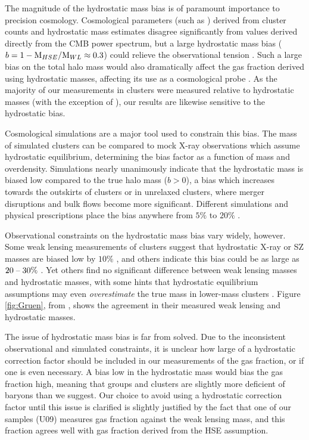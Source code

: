 The magnitude of the hydrostatic mass bias is of paramount importance
to precision cosmology. Cosmological parameters (such as \omegam{})
derived from \Planck{} cluster counts and hydrostatic mass estimates
disagree significantly from values derived directly from the CMB power
spectrum, but a large hydrostatic mass bias ($ b= 1-
\textrm{M}{}_{HSE}/\textrm{M}{}_{WL} \approx 0.3$) could relieve the
observational tension \citep{Gruen2013,VonderLinden2014,
  Israel2014}. Such a large bias on the total halo mass would also
dramatically affect the gas fraction derived using hydrostatic masses,
affecting its use as a cosmological probe
. As the majority of our \fg{}
measurements in clusters were measured relative to hydrostatic masses
(with the exception of \citet{Umetsu2009}), our results are likewise
sensitive to the hydrostatic bias.

Cosmological simulations are a major tool used to constrain this bias.
The mass of simulated clusters can be compared to mock X-ray
observations which assume hydrostatic equilibrium, determining the
bias factor as a function of mass and overdensity. Simulations nearly
unanimously indicate that the hydrostatic mass is biased low compared
to the true halo mass ($b>0$), a bias which increases towards the
outskirts of clusters or in unrelaxed clusters, where merger
disruptions and bulk flows become more significant. Different
simulations and physical prescriptions place the bias anywhere from
$5\%$  to $20\%$
.

Observational constraints on the hydrostatic mass bias vary widely,
however. Some weak lensing measurements of clusters suggest that
hydrostatic X-ray or SZ masses are biased low by $10\%$
\citep{Andersson2011,High2012}, and others indicate this bias could be
as large as $20\;\textrm{--}\;30\%$
\citep{Arnaud2007,Ichikawa2013,VonderLinden2014}. Yet others find no
significant difference between weak lensing masses and hydrostatic
masses, with some hints that hydrostatic equilibrium assumptions may
even \textit{overestimate} the true mass in lower-mass clusters
\citep{Gruen2013, Israel2014}. Figure \ref{fig:Gruen}, from
\citet{Gruen2013}, shows the agreement in their measured weak lensing
and hydrostatic masses.


\afterpage{\clearpage}

The issue of hydrostatic mass bias is far from solved. Due to the
inconsistent observational and simulated constraints, it is unclear
how large of a hydrostatic correction factor should be included in our
measurements of the gas fraction, or if one is even necessary. A bias
low in the hydrostatic mass would bias the gas fraction high, meaning
that groups and clusters are slightly more deficient of baryons than
we suggest. Our choice to avoid using a hydrostatic correction factor
until this issue is clarified is slightly justified by the fact that
one of our samples (U09) measures gas fraction against the weak
lensing mass, and this fraction agrees well with gas fraction derived
from the HSE assumption.

